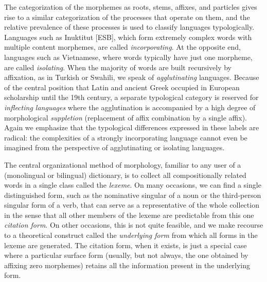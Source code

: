 The categorization of the morphemes as roots, stems, affixes, and particles
gives rise to a similar categorization of the processes that operate on them,
and the relative prevalence of these processes is used to classify languages
typologically. Languages such as Inuktitut [ESB], which form extremely complex
words with multiple content morphemes, are called {\it incorporating}.
 At the opposite end, languages such as
Vietnamese, where words typically have just one morpheme, are called {\it
  isolating}. When the majority of words are built recursively by affixation,
as in Turkish or Swahili, we speak of {\it agglutinating} languages.
 Because of the central position that Latin and
ancient Greek occupied in European scholarship until the 19th century, a
separate typological category is reserved for {\it inflecting languages} where
the agglutination is accompanied by a high degree of morphological {\it
  suppletion} (replacement of affix combination by a single affix).
 Again we emphasize that the typological
differences expressed in these labels are radical: the complexities of a
strongly incorporating language cannot even be imagined from the perspective
of agglutinating or isolating languages.   
   

The central organizational method of morphology, familiar to any user of a
(monolingual or bilingual) dictionary, is to collect all compositionally
related words in a single class called the {\it lexeme}. On many occasions, we
can find a single distinguished form, such as the nominative singular of a
noun or the third-person singular form of a verb, that can serve as a
representative of the whole collection in the sense that all other members of
the lexeme are predictable from this one {\it citation form}. On other
occasions, this is not quite feasible, and we make recourse to a theoretical
construct called the {\it underlying form} from which all forms in the lexeme
are generated. The citation form, when it exists, is just a special case where
a particular surface form (usually, but not always, the one obtained by
affixing zero morphemes) retains all the information present in the underlying
form.   

